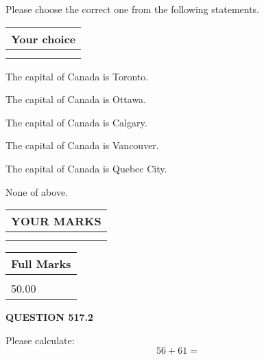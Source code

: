\documentclass[12pt]{article}
\begin{document}
  
Please choose the correct one from the following statements.
  
  
\noindent\hspace{3.0in} \begin{tabular}{|l|}
\hline
Your choice \\
\hline
 \\ 
 \\ 
\hline
\end{tabular}
  
  
 
 
The capital of Canada is Toronto.
 
 
The capital of Canada is Ottawa.
 
 
The capital of Canada is Calgary.
 
 
The capital of Canada is Vancouver.
 
 
The capital of Canada is Quebec City.
 
 
 None of above.
 
 
  
\vspace{0.2in}
  
\noindent\begin{tabular}{|l|}
\hline
 YOUR MARKS  \\
\hline
 \\ 
 \\ 
\hline
\end{tabular}
\hspace{0.05in} \begin{tabular}{|l|}
\hline
 Full Marks  \\
\hline
 \\ 
50.00 \\
\hline
\end{tabular}
{\textbf{\Large{QUESTION
517.2 
}}}
  
  
 
Please calculate:
\begin{equation}
56 +  %
61 = \nonumber
\end{equation}
 

 

 
   
   
 \vspace{0.2in}
 
   
   
   
   
\end{document}
